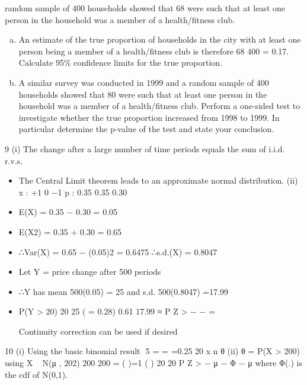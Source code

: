 \documentclass[a4paper,12pt]{article}
\begin{document}
\begin{enumerate}
random sample of 400 households showed that 68 were such that at least one
person in the household was a member of a health/fitness club.
\begin{enumerate}[(a)]
\item  An estimate of the true proportion of households in the city with at least
one person being a member of a health/fitness club is therefore
68
400
= 0.17. Calculate 95\% confidence limits for the true proportion.
\item A similar survey was conducted in 1999 and a random sample of 400
households showed that 80 were such that at least one person in the
household was a member of a health/fitness club.
Perform a one-sided test to investigate whether the true proportion
increased from 1998 to 1999. In particular determine the p-value of the
test and state your conclusion. 
\end{enumerate}
9 (i) The change after a large number of time periods equals the sum of i.i.d.
r.v.s.

\begin{itemize}
    \item The Central Limit theorem leads to an approximate normal distribution.
(ii)
x : +1 0 −1
p : 0.35 0.35 0.30
\item E(X) = 0.35 − 0.30 = 0.05
\item E(X2) = 0.35 + 0.30 = 0.65
\item ∴Var(X) = 0.65 − (0.05)2 = 0.6475 ∴s.d.(X) = 0.8047
\item Let Y = price change after 500 periods
\item ∴Y has mean 500(0.05) = 25 and s.d. 500(0.8047) =17.99
\item P(Y > 20)
20 25
( = 0.28) 0.61
17.99
≈ P Z > − − =
\item [Continuity correction can be used if desired]
\end{itemize}


\newpage

10 (i) Using the basic binomial result
 5 = = =0.25
20
x
n
θ
(ii) θ = P(X > 200) using X ~ N(μ , 202)
200 200
= ( )=1 ( )
20 20
P Z > − μ − Φ − μ
where Φ(.) is the cdf of N(0,1).


\end{enumerate}
\end{document}
